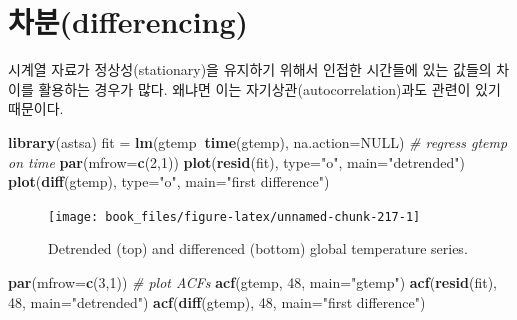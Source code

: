 \documentclass[b5paper,]{scrbook}
\makeatletter
\newenvironment{Shaded}{\begin{snugshade}}{\end{snugshade}}
\newcommand{\CommentTok}[1]{\textcolor[rgb]{0.56,0.35,0.01}{\textit{#1}}}
\newcommand{\DataTypeTok}[1]{\textcolor[rgb]{0.13,0.29,0.53}{#1}}
\newcommand{\DecValTok}[1]{\textcolor[rgb]{0.00,0.00,0.81}{#1}}
\newcommand{\KeywordTok}[1]{\textcolor[rgb]{0.13,0.29,0.53}{\textbf{#1}}}
\newcommand{\NormalTok}[1]{#1}
\newcommand{\OperatorTok}[1]{\textcolor[rgb]{0.81,0.36,0.00}{\textbf{#1}}}
\newcommand{\OtherTok}[1]{\textcolor[rgb]{0.56,0.35,0.01}{#1}}
\newcommand{\StringTok}[1]{\textcolor[rgb]{0.31,0.60,0.02}{#1}}
\theoremstyle{plain}
\theoremstyle{definition}
\numberwithin{equation}{section}
\newenvironment{kframe}{%
\medskip{}
\setlength{\fboxsep}{.8em}
 \def\at@end@of@kframe{}%
 \ifinner\ifhmode%
  \def\at@end@of@kframe{\end{minipage}}%
  \begin{minipage}{\columnwidth}%
 \fi\fi%
 \def\FrameCommand##1{\hskip\@totalleftmargin \hskip-\fboxsep
 \colorbox{shadecolor}{##1}\hskip-\fboxsep
     \hskip-\linewidth \hskip-\@totalleftmargin \hskip\columnwidth}%
 \MakeFramed {\advance\hsize-\width
   \@totalleftmargin\z@ \linewidth\hsize
   \@setminipage}}%
 {\par\unskip\endMakeFramed%
 \at@end@of@kframe}
\renewenvironment{Shaded}{\begin{kframe}}{\end{kframe}}
\makeatother
\begin{document}
\hypertarget{differencing}{%
\section{차분(differencing)}\label{differencing}}

시계열 자료가 정상성(stationary)을 유지하기 위해서 인접한 시간들에 있는 값들의 차이를 활용하는 경우가 많다. 왜냐면 이는 자기상관(autocorrelation)과도 관련이 있기 때문이다.

\begin{Shaded}
\begin{Highlighting}[]
\KeywordTok{library}\NormalTok{(astsa)}
\NormalTok{fit =}\StringTok{ }\KeywordTok{lm}\NormalTok{(gtemp}\OperatorTok{~}\KeywordTok{time}\NormalTok{(gtemp), }\DataTypeTok{na.action=}\OtherTok{NULL}\NormalTok{) }\CommentTok{# regress gtemp on time}
\KeywordTok{par}\NormalTok{(}\DataTypeTok{mfrow=}\KeywordTok{c}\NormalTok{(}\DecValTok{2}\NormalTok{,}\DecValTok{1}\NormalTok{))}
\KeywordTok{plot}\NormalTok{(}\KeywordTok{resid}\NormalTok{(fit), }\DataTypeTok{type=}\StringTok{"o"}\NormalTok{, }\DataTypeTok{main=}\StringTok{"detrended"}\NormalTok{)}
\KeywordTok{plot}\NormalTok{(}\KeywordTok{diff}\NormalTok{(gtemp), }\DataTypeTok{type=}\StringTok{"o"}\NormalTok{, }\DataTypeTok{main=}\StringTok{"first difference"}\NormalTok{)}
\end{Highlighting}
\end{Shaded}

\begin{figure}

{\centering \texttt{[image: book\_files/figure-latex/unnamed-chunk-217-1]} 

}

\caption{Detrended (top) and differenced (bottom) global temperature series.}\label{fig:unnamed-chunk-217}
\end{figure}

\begin{Shaded}
\begin{Highlighting}[]
\KeywordTok{par}\NormalTok{(}\DataTypeTok{mfrow=}\KeywordTok{c}\NormalTok{(}\DecValTok{3}\NormalTok{,}\DecValTok{1}\NormalTok{)) }\CommentTok{# plot ACFs}
\KeywordTok{acf}\NormalTok{(gtemp, }\DecValTok{48}\NormalTok{, }\DataTypeTok{main=}\StringTok{"gtemp"}\NormalTok{)}
\KeywordTok{acf}\NormalTok{(}\KeywordTok{resid}\NormalTok{(fit), }\DecValTok{48}\NormalTok{, }\DataTypeTok{main=}\StringTok{"detrended"}\NormalTok{)}
\KeywordTok{acf}\NormalTok{(}\KeywordTok{diff}\NormalTok{(gtemp), }\DecValTok{48}\NormalTok{, }\DataTypeTok{main=}\StringTok{"first difference"}\NormalTok{)}
\end{Highlighting}
\end{Shaded}
\end{document}
